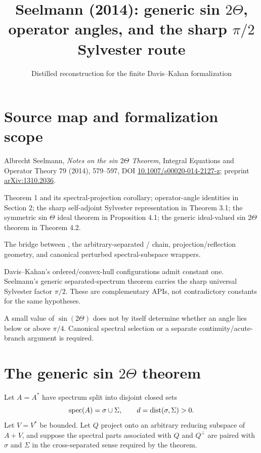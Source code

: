 
\title{Seelmann (2014): generic sin $2\Theta$, operator angles, and the sharp $\pi/2$ Sylvester route}
\author{}
\date{Distilled reconstruction for the finite Davis--Kahan formalization}

\maketitle

\section*{Source map and formalization scope}
\begin{sourceguide}
\item[Primary source] Albrecht Seelmann, \emph{Notes on the sin $2\Theta$ Theorem}, Integral Equations and Operator Theory 79 (2014), 579--597, DOI \href{https://doi.org/10.1007/s00020-014-2127-z}{10.1007/s00020-014-2127-z}; preprint \href{https://arxiv.org/abs/1310.2036}{arXiv:1310.2036}.
\item[Coverage] Theorem 1 and its spectral-projection corollary; operator-angle identities in Section 2; the sharp self-adjoint Sylvester representation in Theorem 3.1; the symmetric sin $\Theta$ ideal theorem in Proposition 4.1; the generic ideal-valued sin $2\Theta$ theorem in Theorem 4.2.
\item[Formalization target] The bridge between , the arbitrary-separated / chain, projection/reflection geometry, and canonical perturbed spectral-subspace wrappers.
\item[Attribution boundary] Davis--Kahan's ordered/convex-hull configurations admit constant one. Seelmann's generic separated-spectrum theorem carries the sharp universal Sylvester factor $\pi/2$. These are complementary APIs, not contradictory constants for the same hypotheses.
\item[Branch warning] A small value of $\sin(2\Theta)$ does not by itself determine whether an angle lies below or above $\pi/4$. Canonical spectral selection or a separate continuity/acute-branch argument is required.
\end{sourceguide}

\section{The generic sin $2\Theta$ theorem}

Let $A=A^*$ have spectrum split into disjoint closed sets
\[
 \operatorname{spec}(A)=\sigma\cup\Sigma,
 \qquad
 d=\operatorname{dist}(\sigma,\Sigma)>0.
\]
Let $V=V^*$ be bounded. Let $Q$ project onto an arbitrary reducing subspace of $A+V$, and suppose the spectral parts associated with $Q$ and $Q^\perp$ are paired with $\sigma$ and $\Sigma$ in the cross-separated sense required by the theorem.

